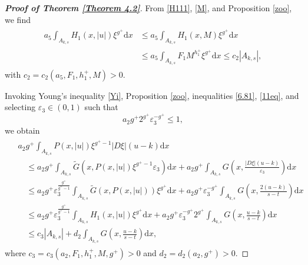 \documentclass[10pt,reqno]{amsart}
\newcommand *\w{^\wedge}
\theoremstyle{definition}
\numberwithin{equation}{section}
\begin{document}
\begin{proof}[\textbf{Proof of Theorem \ref{Theorem 4.2}}]
 From \eqref{H111}, \eqref{M}, and Proposition \ref{zoo}, we find
\begin{align}\label{11eq}
    \begin{split}
        a_5 \int_{A_{k,s}} H_1(x,|u|) \xi^{g^+}  \mathrm{d}x &\leq a_5 \int_{A_{k,s}} H_1(x, M) \xi^{g^+}  \mathrm{d}x \\
        &\leq a_5 \int_{A_{k,s}} F_1 M^{h_1^+} \xi^{g^+}  \mathrm{d}x \leq c_2 |A_{k,s}|,
    \end{split}
\end{align}
with \(c_2 = c_2(a_5, F_1, h_1^+, M) > 0\).

 Invoking Young's inequality \eqref{Yi}, Proposition \ref{zoo}, inequalities \eqref{6.81}, \eqref{11eq}, and selecting \(\varepsilon_3 \in (0,1)\) such that
\[
a_2g^+ 2^{g^+} \varepsilon_3^{-g^+} \leq 1,
\]
we obtain
\begin{align}\label{22eq}
    \begin{split}
        &a_2 g^+\int_{A_{k,s}} P(x,|u|) \xi^{g^+-1} |D\xi|(u - k)  \mathrm{d}x \\
        &\quad \leq a_2 g^+ \int_{A_{k,s}} \widetilde{G}\left(x, P(x,|u|) \xi^{g^+-1}\varepsilon_3\right)  \mathrm{d}x + a_2 g^+ \int_{A_{k,s}} G\left(x, \frac{|D\xi|(u - k)}{\varepsilon_3}\right)  \mathrm{d}x \\
        &\quad \leq a_2 g^+ \varepsilon_3^{\frac{g^+}{g^+-1}} \int_{A_{k,s}} \widetilde{G}\left(x, P(x,|u|) \right) \xi^{g^+}  \mathrm{d}x + a_2 g^+ \varepsilon_3^{-g^+} \int_{A_{k,s}} G\left(x, \frac{2(u - k)}{s-t}\right)  \mathrm{d}x \\
        &\quad \leq a_2 g^+ \varepsilon_3^{\frac{g^+}{g^+-1}} \int_{A_{k,s}} H_1(x,|u|)  \xi^{g^+}  \mathrm{d}x + a_2 g^+ \varepsilon_3^{-g^+} 2^{g^+} \int_{A_{k,s}} G\left(x, \frac{u - k}{s-t}\right)  \mathrm{d}x \\
        &\quad \leq c_3 |A_{k,s}| + d_2 \int_{A_{k,s}} G\left(x, \frac{u - k}{s - t} \right)  \mathrm{d}x,
    \end{split}
\end{align}
where \(c_3 = c_3(a_2, F_1, h_1^+, M, g^+) > 0\) and \(d_2 = d_2(a_2, g^+) > 0\).


\end{proof}
\end{document}
